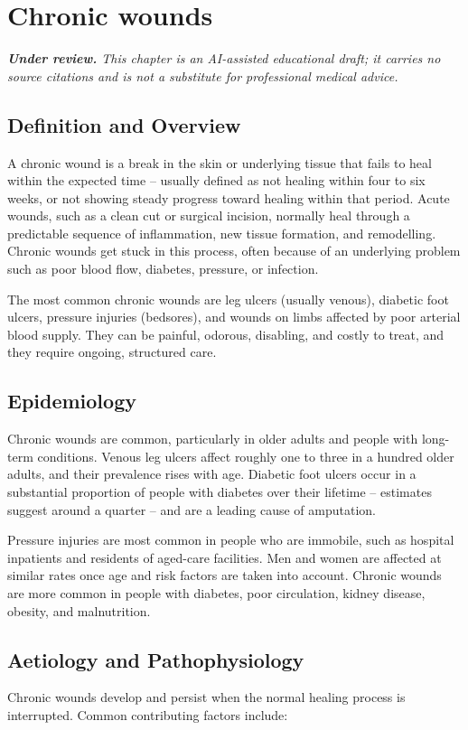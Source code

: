 \chapter{Chronic wounds}

\medskip
\noindent\textit{\textbf{Under review.} This chapter is an AI-assisted educational draft; it carries no source citations and is not a substitute for professional medical advice.}

\section*{Definition and Overview}
A chronic wound is a break in the skin or underlying tissue that fails to heal within the expected time -- usually defined as not healing within four to six weeks, or not showing steady progress toward healing within that period. Acute wounds, such as a clean cut or surgical incision, normally heal through a predictable sequence of inflammation, new tissue formation, and remodelling. Chronic wounds get stuck in this process, often because of an underlying problem such as poor blood flow, diabetes, pressure, or infection.

The most common chronic wounds are leg ulcers (usually venous), diabetic foot ulcers, pressure injuries (bedsores), and wounds on limbs affected by poor arterial blood supply. They can be painful, odorous, disabling, and costly to treat, and they require ongoing, structured care.

\section*{Epidemiology}
Chronic wounds are common, particularly in older adults and people with long-term conditions. Venous leg ulcers affect roughly one to three in a hundred older adults, and their prevalence rises with age. Diabetic foot ulcers occur in a substantial proportion of people with diabetes over their lifetime -- estimates suggest around a quarter -- and are a leading cause of amputation.

Pressure injuries are most common in people who are immobile, such as hospital inpatients and residents of aged-care facilities. Men and women are affected at similar rates once age and risk factors are taken into account. Chronic wounds are more common in people with diabetes, poor circulation, kidney disease, obesity, and malnutrition.

\section*{Aetiology and Pathophysiology}
Chronic wounds develop and persist when the normal healing process is interrupted. Common contributing factors include:

